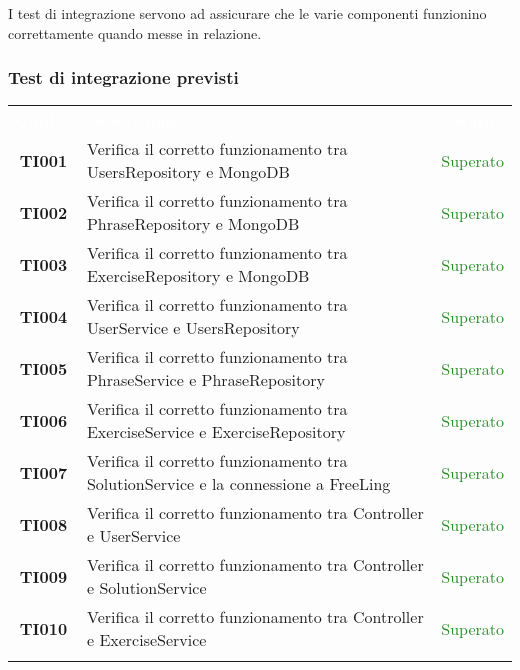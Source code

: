 I test di integrazione servono ad assicurare che le varie componenti funzionino correttamente quando messe in relazione.


\subsubsection{Test di integrazione previsti}

\begin{tabularx}{\textwidth}{cXc}
	
	\rowcolor{greySWEight}
	
	\rowcolor{greySWEight}
	\textcolor{white}{\textbf{Codice}} & 
	\textcolor{white}{\textbf{Descrizione}} &
	\textcolor{white}{\textbf{Stato}} \\

\textbf{TI001} & Verifica il corretto funzionamento tra UsersRepository e MongoDB & \textcolor{ForestGreen}{Superato} \\
\textbf{TI002} & Verifica il corretto funzionamento tra PhraseRepository e MongoDB & \textcolor{ForestGreen}{Superato} \\
\textbf{TI003} & Verifica il corretto funzionamento tra ExerciseRepository e MongoDB & \textcolor{ForestGreen}{Superato} \\
\textbf{TI004} & Verifica il corretto funzionamento tra UserService e UsersRepository & \textcolor{ForestGreen}{Superato} \\
\textbf{TI005} & Verifica il corretto funzionamento tra PhraseService e PhraseRepository & \textcolor{ForestGreen}{Superato} \\
\textbf{TI006} & Verifica il corretto funzionamento tra ExerciseService e ExerciseRepository & \textcolor{ForestGreen}{Superato} \\
\textbf{TI007} & Verifica il corretto funzionamento tra SolutionService e la connessione a FreeLing & \textcolor{ForestGreen}{Superato} \\
\textbf{TI008} & Verifica il corretto funzionamento tra Controller e UserService & \textcolor{ForestGreen}{Superato} \\
\textbf{TI009} & Verifica il corretto funzionamento tra Controller e SolutionService & \textcolor{ForestGreen}{Superato} \\
\textbf{TI010} & Verifica il corretto funzionamento tra Controller e ExerciseService & \textcolor{ForestGreen}{Superato} \\
	
	\rowcolor{white}
	\caption{Test di integrazione}
	\label{tab:tabellatestintegrazione}
\end{tabularx}


